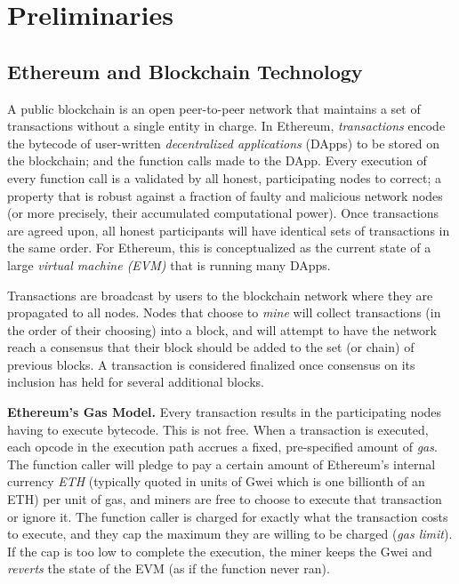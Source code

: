 
\section{Preliminaries}

\subsection{Ethereum and Blockchain Technology}

A public blockchain is an open peer-to-peer network that maintains a set of transactions without a single entity in charge. In Ethereum, \emph{transactions} encode the bytecode of user-written \emph{decentralized applications} (DApps) to be stored on the blockchain; and the function calls made to the DApp. Every execution of every function call is a validated by all honest, participating nodes to correct; a property that is robust against a fraction of faulty and malicious network nodes (or more precisely, their accumulated computational power). Once transactions are agreed upon, all honest participants will have identical sets of transactions in the same order. For Ethereum, this is conceptualized as the current state of a large \emph{virtual machine (EVM)} that is running many DApps. 

Transactions are broadcast by users to the blockchain network where they are propagated to all nodes. Nodes that choose to \emph{mine} will collect transactions (in the order of their choosing) into a block, and will attempt to have the network reach a consensus that their block should be added to the set (or chain) of previous blocks. A transaction is considered finalized once consensus on its inclusion has held for several additional blocks.

\textbf{Ethereum's Gas Model.} Every transaction results in the participating nodes having to execute bytecode. This is not free. When a transaction is executed, each opcode in the execution path accrues a fixed, pre-specified amount of \emph{gas}. The function caller will pledge to pay a certain amount of Ethereum's internal currency \emph{ETH} (typically quoted in units of Gwei which is one billionth of an ETH) per unit of gas, and miners are free to choose to execute that transaction or ignore it. The function caller is charged for exactly what the transaction costs to execute, and they cap the maximum they are willing to be charged (\textit{gas limit}). If the cap is too low to complete the execution, the miner keeps the Gwei and \emph{reverts} the state of the EVM (as if the function never ran).

